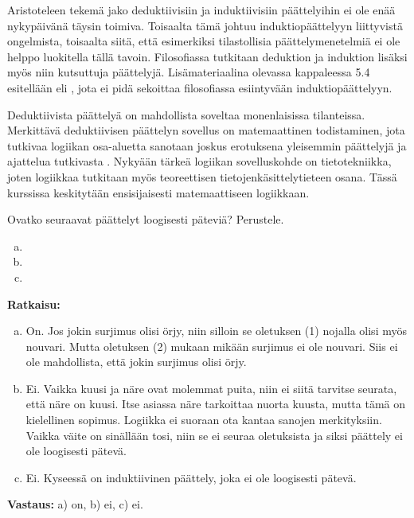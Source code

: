Aristoteleen tekemä jako deduktiivisiin ja induktiivisiin päättelyihin
ei ole enää nykypäivänä täysin toimiva.
Toisaalta tämä johtuu induktiopäättelyyn liittyvistä ongelmista,
toisaalta siitä, että esimerkiksi tilastollisia päättelymenetelmiä
ei ole helppo luokitella tällä tavoin.
Filosofiassa tutkitaan deduktion ja induktion lisäksi myös niin kutsuttuja
 päättelyjä.
Lisämateriaalina olevassa kappaleessa 5.4 esitellään
 eli
,
jota ei pidä sekoittaa filosofiassa esiintyvään induktiopäättelyyn.

Deduktiivista päättelyä on mahdollista soveltaa monenlaisissa tilanteissa.
Merkittävä deduktiivisen päättelyn sovellus on matemaattinen todistaminen,
jota tutkivaa logiikan osa-aluetta sanotaan joskus
 erotuksena
yleisemmin päättelyjä ja ajattelua tutkivasta
.
Nykyään tärkeä logiikan sovelluskohde on tietotekniikka, joten logiikkaa
tutkitaan myös teoreettisen tietojen\-käsittely\-tieteen osana.
Tässä kurssissa keskitytään ensisijaisesti matemaattiseen logiikkaan.

\begin{esimerkki} Ovatko seuraavat päättelyt loogisesti päteviä? Perustele.
    \begin{enumerate}[a)]
        \item {}
        \item {}
        \item {}
    \end{enumerate}
    \textbf{Ratkaisu:}
        \begin{enumerate}[a)]
            \item On. Jos jokin surjimus olisi örjy, niin silloin se oletuksen (1) nojalla olisi myös nouvari.
                Mutta oletuksen (2) mukaan mikään surjimus ei ole nouvari. Siis ei ole
                mahdollista, että jokin surjimus olisi örjy. 
            \item Ei. Vaikka kuusi ja näre ovat molemmat puita, niin ei siitä tarvitse seurata,
                että näre on kuusi. Itse asiassa näre tarkoittaa nuorta kuusta, mutta tämä on kielellinen sopimus.
                Logiikka ei suoraan ota kantaa sanojen merkityksiin.
                Vaikka väite on sinällään tosi, niin se ei seuraa oletuksista ja siksi päättely ei ole loogisesti pätevä.
            \item Ei. Kyseessä on induktiivinen päättely, joka ei ole loogisesti pätevä.
        \end{enumerate}
    \textbf{Vastaus:}
        a) on, b) ei, c) ei.
\end{esimerkki}

